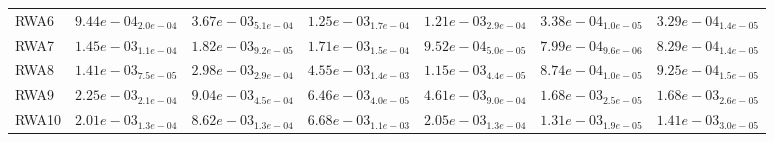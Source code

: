 \documentclass{article}
\begin{document}
\begin{table}
\begin{scriptsize}
\begin{tabular}{lllllll}
RWA6 & $  9.44e-04_{ 2.0e-04}$ & $  3.67e-03_{ 5.1e-04}$ & $  1.25e-03_{ 1.7e-04}$ & $  1.21e-03_{ 2.9e-04}$ & \cellcolor{gray25}$  3.38e-04_{ 1.0e-05}$ & \cellcolor{gray95}$  3.29e-04_{ 1.4e-05}$ \\
RWA7 & $  1.45e-03_{ 1.1e-04}$ & $  1.82e-03_{ 9.2e-05}$ & $  1.71e-03_{ 1.5e-04}$ & $  9.52e-04_{ 5.0e-05}$ & \cellcolor{gray95}$  7.99e-04_{ 9.6e-06}$ & \cellcolor{gray25}$  8.29e-04_{ 1.4e-05}$ \\
RWA8 & $  1.41e-03_{ 7.5e-05}$ & $  2.98e-03_{ 2.9e-04}$ & $  4.55e-03_{ 1.4e-03}$ & $  1.15e-03_{ 4.4e-05}$ & \cellcolor{gray95}$  8.74e-04_{ 1.0e-05}$ & \cellcolor{gray25}$  9.25e-04_{ 1.5e-05}$ \\
RWA9 & $  2.25e-03_{ 2.1e-04}$ & $  9.04e-03_{ 4.5e-04}$ & $  6.46e-03_{ 4.0e-05}$ & $  4.61e-03_{ 9.0e-04}$ & \cellcolor{gray95}$  1.68e-03_{ 2.5e-05}$ & \cellcolor{gray25}$  1.68e-03_{ 2.6e-05}$ \\
RWA10 & $  2.01e-03_{ 1.3e-04}$ & $  8.62e-03_{ 1.3e-04}$ & $  6.68e-03_{ 1.1e-03}$ & $  2.05e-03_{ 1.3e-04}$ & \cellcolor{gray95}$  1.31e-03_{ 1.9e-05}$ & \cellcolor{gray25}$  1.41e-03_{ 3.0e-05}$ \\
\hline
\end{tabular}
\end{scriptsize}
\end{table}
\end{document}
